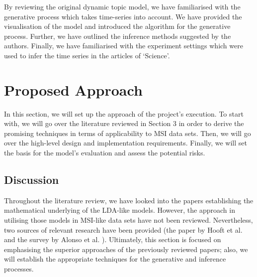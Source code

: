 \documentclass{mprop}
\begin{document}
\par By reviewing the original dynamic topic model, we have familiarised with the generative process which takes time-series into account. We have provided the visualisation of the model and introduced the algorithm for the generative process. Further, we have outlined the inference methods suggested by the authors. Finally, we have familiarised with the experiment settings which were used to infer the time series in the articles of `Science'. 

\section{Proposed Approach}

\par In this section, we will set up the approach of the project's execution. To start with, we will go over the literature reviewed in Section 3 in order to derive the promising techniques in terms of applicability to MSI data sets. Then, we will go over the high-level design and implementation requirements. Finally, we will set the basis for the model's evaluation and assess the potential risks. 


\subsection{Discussion}

\par Throughout the literature review, we have looked into the papers establishing the mathematical underlying of the LDA-like models. However, the approach in utilising those models in MSI-like data sets have not been reviewed. Nevertheless, two sources of relevant research have been provided (the paper by Hooft et al. \cite{hooft} and the survey by Alonso et al. \cite{alonso-et-al}). Ultimately, this section is focused on emphasising the superior approaches of the previously reviewed papers; also, we will establish the appropriate techniques for the generative and inference processes.
\end{document}
